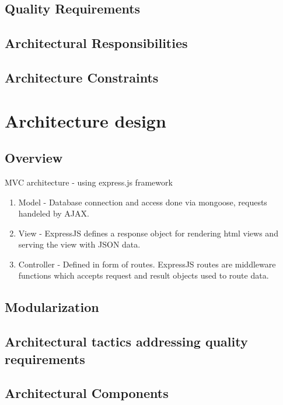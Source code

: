 \documentclass[hidelinks, 12pt, oneside]{article}
\begin{document}
\subsection{Quality Requirements}

\subsection{Architectural Responsibilities}

\subsection{Architecture Constraints}

\section{Architecture design}
\subsection{Overview}
MVC architecture - using express.js framework
\begin {enumerate}
\item Model - Database connection and access done via mongoose, requests handeled by AJAX.
\item View - ExpressJS defines a response object for rendering html views and serving the view with JSON data.
\item Controller - Defined in form of routes. ExpressJS routes  are middleware functions which accepts request and result objects used to route data.
\end {enumerate}
\subsection{Modularization}

\subsection{Architectural tactics addressing quality requirements}

\subsection{Architectural Components}

\end{document}
